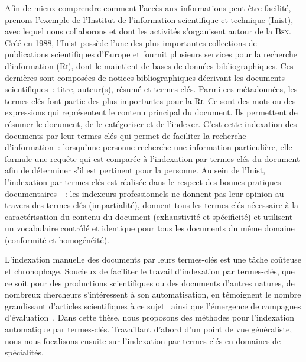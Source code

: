     Afin de mieux comprendre comment l'accès aux informations peut être
    facilité, prenons l'exemple de l'Institut de l'information scientifique et
    technique (Inist), avec lequel nous collaborons et dont les activités
    s'organisent autour de la \textsc{Bsn}. Créé en 1988, l'Inist possède l'une
    des plus importantes collections de publications scientifiques d'Europe et
    fournit plusieurs services pour la recherche d'information (\textsc{Ri}),
    dont le maintient de bases de données bibliographiques. Ces dernières sont
    composées de notices bibliographiques décrivant les documents
    scientifiques~: titre, auteur(s), résumé et termes-clés. Parmi ces
    métadonnées, les termes-clés font partie des plus importantes pour la
    \textsc{Ri}. Ce sont des mots ou des expressions qui représentent le contenu
    principal du document. Ils permettent de résumer le document, de le
    catégoriser et de l'indexer. C'est cette indexation des documents par leur
    termes-clés qui permet de faciliter la recherche d'information~: lorsqu'une
    personne recherche une information particulière, elle formule une requête qui
    est comparée à l'indexation par termes-clés du document afin de déterminer
    s'il est pertinent pour la personne. Au sein de l'Inist, l'indexation par
    termes-clés est réalisée dans le respect des bonnes pratiques
    documentaires~\cite{guinchat1996techniquesdocumentaires}~: les indexeurs
    professionnels ne donnent pas leur opinion au travers des termes-clés
    (impartialité), donnent tous les termes-clés nécessaire à la caractérisation
    du contenu du document (exhaustivité et spécificité) et utilisent un
    vocabulaire contrôlé et identique pour tous les documents du même domaine
    (conformité et homogénéité). 

    L'indexation manuelle des documents par leurs termes-clés est une tâche
    coûteuse et chronophage. Soucieux de faciliter le travail d'indexation par
    termes-clés, que ce soit pour des productions scientifiques ou des documents
    d'autres natures, de nombreux chercheurs s'intéressent à son automatisation,
    en témoignent le nombre grandissant d'articles scientifiques à ce
    sujet~\cite{hasan2014state_of_the_art} ainsi que l'émergence de campagnes
    d'évaluation~\cite{kim2010semeval,paroubek2012deft}. Dans cette thèse, nous
    proposons des méthodes pour l'indexation automatique par termes-clés.
    Travaillant d'abord d'un point de vue généraliste, nous nous focalisons
    ensuite sur l'indexation par termes-clés en domaines de spécialités.

